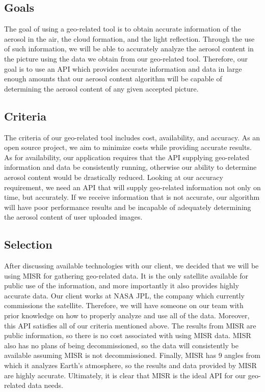 \documentclass[letterpaper,10pt,draftclsnofoot,onecolumn]{IEEEtran}
\begin{document}
\begin{flushleft}
\subsection{Goals}
The goal of using a geo-related tool is to obtain accurate information of the aerosol in the air, the cloud formation, and the light reflection. Through the use of such information, we will be able to accurately analyze the aerosol content in the picture using the data we obtain from our geo-related tool. Therefore, our goal is to use an API which provides accurate information and data in large enough amounts that our aerosol content algorithm will be capable of determining the aerosol content of any given accepted picture. 
\subsection{Criteria}
The criteria of our geo-related tool includes cost, availability, and accuracy. As an open source project, we aim to minimize costs while providing accurate results. As for availability, our application requires that the API supplying geo-related information and data be consistently running, otherwise our ability to determine aerosol content would be drastically reduced. Looking at our accuracy requirement, we need an API that will supply geo-related information not only on time, but accurately. If we receive information that is not accurate, our algorithm will have poor performance results and be incapable of adequately determining the aerosol content of user uploaded images.
\subsection{Selection}
After discussing available technologies with our client, we decided that we will be using MISR for gathering geo-related data. It is the only satellite available for public use of the information, and more importantly it also provides highly accurate data. Our client works at NASA JPL,  the company which currently commissions the satellite. Therefore, we will have someone on our team with prior knowledge on how to properly analyze and use all of the data. Moreover, this API satisfies all of our criteria mentioned above. The results from MISR are public information, so there is no cost associated with using MISR data. MISR also has no plans of being decommissioned, so the data will consistently be available assuming MISR is not decommissioned. Finally, MISR has 9 angles from which it analyzes Earth’s atmosphere, so the results and data provided by MISR are highly accurate. Ultimately, it is clear that MISR is the ideal API for our geo-related data needs.


\end{flushleft}
\end{document}
